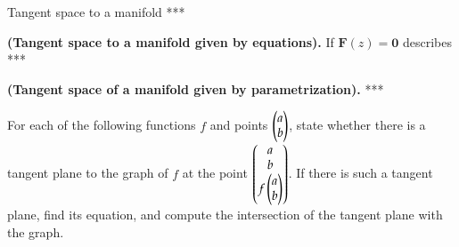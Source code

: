 \begin{enumerate}[1.]
\begin{center}
\end{center}

\end{enumerate}

\begin{defn}{Tangent space to a manifold}
***
\end{defn}

\begin{theorem}
  \textbf{(Tangent space to a manifold given by equations).} If $\bm{F}(z)=\bm{0}$ describes ***
\end{theorem}

\begin{proposition}
  \textbf{(Tangent space of a manifold given by parametrization).} ***
\end{proposition}

For each of the following functions $f$ and points $\begin{pmatrix} a \\ b \end{pmatrix}$, state whether there is a tangent plane to the graph of $f$ at the point $\begin{pmatrix} a \\ b \\ f\begin{pmatrix} a \\ b \end{pmatrix} \end{pmatrix}$. If there is such a tangent plane, find its equation, and compute the intersection of the tangent plane with the graph.

